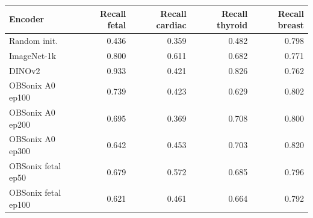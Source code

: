 \begin{tabular}{lrrrr}
\toprule
Encoder & Recall fetal & Recall cardiac & Recall thyroid & Recall breast \\
\midrule
Random init. & 0.436 & 0.359 & 0.482 & 0.798 \\
ImageNet-1k & 0.800 & 0.611 & 0.682 & 0.771 \\
DINOv2 & 0.933 & 0.421 & 0.826 & 0.762 \\
OBSonix A0 ep100 & 0.739 & 0.423 & 0.629 & 0.802 \\
OBSonix A0 ep200 & 0.695 & 0.369 & 0.708 & 0.800 \\
OBSonix A0 ep300 & 0.642 & 0.453 & 0.703 & 0.820 \\
OBSonix fetal ep50 & 0.679 & 0.572 & 0.685 & 0.796 \\
OBSonix fetal ep100 & 0.621 & 0.461 & 0.664 & 0.792 \\
\bottomrule
\end{tabular}
